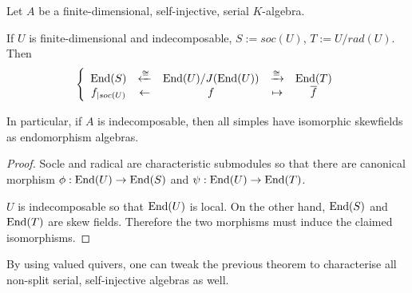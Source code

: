 \documentclass[fontsize=11pt,fleqn,a4paper]{scrartcl}
\begin{document}
\begin{proposition}
Let $A$ be a finite-dimensional, self-injective, serial $K$-algebra. 

If $U$ is finite-dimensional and indecomposable, $S:=soc(U)$, $T:=U/rad(U)$. Then
\[\left\{\begin{array}{ccccc}
\operatorname{End}(S) & \xleftarrow{\cong}& \operatorname{End}(U)/J(\operatorname{End}(U)) &\xrightarrow{\cong}& \operatorname{End}(T) \\
f_{|soc(U)} & \leftarrow & f & \mapsto & \overline{f}
\end{array}\right.\]

In particular, if $A$ is indecomposable, then all simples have isomorphic skewfields as endomorphism algebras.
\end{proposition}
\begin{proof}
Socle and radical are characteristic submodules so that there are canonical morphism $\phi: \operatorname{End}(U) \to \operatorname{End}(S)$ and $\psi: \operatorname{End}(U)\to \operatorname{End}(T)$.

$U$ is indecomposable so that $\operatorname{End}(U)$ is local. On the other hand, $\operatorname{End}(S)$ and $\operatorname{End}(T)$ are skew fields. Therefore the two morphisms must induce the claimed isomorphisms.
\end{proof}

\begin{remark}
By using valued quivers, one can tweak the previous theorem to characterise all non-split serial, self-injective algebras as well.
\end{remark}
\end{document}

